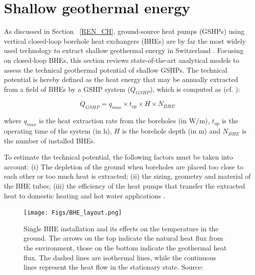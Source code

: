 \section{Shallow geothermal energy}
\label{geo_method}

As discussed in Section ~\ref{REN_CH}, ground-source heat pumps (GSHPs) using vertical closed-loop borehole heat exchangers (BHEs) are by far the most widely used technology to extract shallow geothermal energy in Switzerland \cite{blum_statistik_2016}.
%
Focusing on closed-loop BHEs, this section reviews state-of-the-art analytical models to assess the technical geothermal potential of shallow GSHPs. The technical potential is hereby defined as the heat energy that may be annually extracted from a field of BHEs by a GSHP system ($Q_{GSHP}$), which is computed as (cf. \cite{pahud_geothermal_2002}):

\begin{equation}
\label{eq:Q_field_method}
    Q_\mathit{GSHP}=q_\mathit{max} \times t_{op} \times H \times N_\mathit{BHE}
\end{equation}

where $q_\mathit{max}$ is the heat extraction rate from the boreholes (in W/m), $t_{op}$ is the operating time of the system (in h), $H$ is the borehole depth (in m) and $ N_\mathit{BHE}$ is the number of installed BHEs.

To estimate the technical potential, the following factors must be taken into account: 
(i) The depletion of the ground when boreholes are placed too close to each other or too much heat is extracted; (ii) the sizing, geometry and material of the BHE tubes; (iii) the efficiency of the heat pumps that transfer the extracted heat to domestic heating and hot water applications \cite{bayer_geothermal_2019}. 

\begin{figure}[bt]
    \centering
    \texttt{[image: Figs/BHE\_layout.png]}
    \caption[Single BHE installation and its effects on the temperature in the ground.]{Single BHE installation and its effects on the temperature in the ground. The arrows on the top indicate the natural heat flux from the environment, those on the bottom indicate the geothermal heat flux. The dashed lines are isothermal lines, while the continuous lines represent the heat flow in the stationary state. Source: \citet{wagner_erdsondenpotenzial_2014}}
    \label{fig:BHE}
\end{figure}

